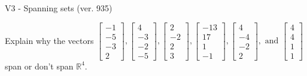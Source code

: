 \begin{exercise}
  \begin{exerciseTitle}V3 - Spanning sets (ver. 935)\end{exerciseTitle}
  \begin{exerciseStatement}
    Explain why the vectors \(\left[\begin{array}{r}
-1 \\
-5 \\
-3 \\
2
\end{array}\right] , \left[\begin{array}{r}
4 \\
-3 \\
-2 \\
-5
\end{array}\right] , \left[\begin{array}{r}
2 \\
-2 \\
2 \\
3
\end{array}\right] , \left[\begin{array}{r}
-13 \\
17 \\
1 \\
-1
\end{array}\right] , \left[\begin{array}{r}
4 \\
-4 \\
-2 \\
2
\end{array}\right] , \text{ and } \left[\begin{array}{r}
4 \\
4 \\
1 \\
1
\end{array}\right]\) span or don't span \(\mathbb{R}^4\). 
	



\end{exerciseStatement}
\end{exercise}

